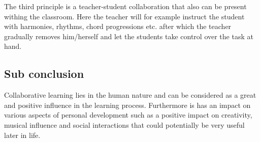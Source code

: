 The third principle is a teacher-student collaboration that also can be present withing the classroom. Here the teacher will for example instruct the student with harmonies, rhythms, chord progressions etc. after which the teacher gradually removes him/herself and let the students take control over the task at hand.\\


\subsection*{Sub conclusion}
Collaborative learning lies in the human nature and can be considered as a great and positive influence in the learning process. Furthermore is has an impact on various aspects of personal development such as a positive impact on creativity, musical influence and social interactions that could potentially be very useful later in life.



